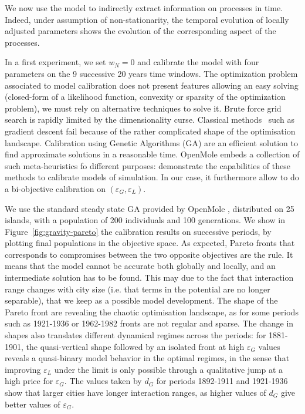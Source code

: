 \documentclass{article}
\begin{document}
We now use the model to indirectly extract information on processes in time. Indeed, under assumption of non-stationarity, the temporal evolution of locally adjusted parameters shows the evolution of the corresponding aspect of the processes.

In a first experiment, we set $w_N=0$ and calibrate the model with four parameters on the 9 successive 20 years time windows. The optimization problem associated to model calibration does not present features allowing an easy solving (closed-form of a likelihood function, convexity or sparsity of the optimization problem), we must rely on alternative techniques to solve it. Brute force grid search is rapidly limited by the dimensionality curse. Classical methods~\citep{batty1972calibration} such as gradient descent fail because of the rather complicated shape of the optimisation landscape. Calibration using Genetic Algorithms (GA) are an efficient solution to find approximate solutions in a reasonable time. OpenMole embeds a collection of such meta-heuristics fo different purposes: \cite{schmitt2014half} demonstrate the capabilities of these methods to calibrate models of simulation. In our case, it furthermore allow to do a bi-objective calibration on $(\varepsilon_G,\varepsilon_L)$.

We use the standard steady state GA provided by OpenMole \citep{pumain2017urban}, distributed on 25 islands, with a population of 200 individuals and 100 generations. We show in Figure~\ref{fig:gravity-pareto} the calibration results on successive periods, by plotting final populations in the objective space. As expected, Pareto fronts that corresponds to compromises between the two opposite objectives are the rule. It means that the model cannot be accurate both globally and locally, and an intermediate solution has to be found. This may due to the fact that interaction range changes with city size (i.e. that terms in the potential are no longer separable), that we keep as a possible model development. The shape of the Pareto front are revealing the chaotic optimisation landscape, as for some periods such as 1921-1936 or 1962-1982 fronts are not regular and sparse. The change in shapes also translates different dynamical regimes across the periods: for 1881-1901, the quasi-vertical shape followed by an isolated front at high $\varepsilon_G$ values reveals a quasi-binary model behavior in the optimal regimes, in the sense that improving $\varepsilon_L$ under the limit is only possible through a qualitative jump at a high price for $\varepsilon_G$. The values taken by $d_G$ for periods 1892-1911 and 1921-1936 show that larger cities have longer interaction ranges, as higher values of $d_G$ give better values of $\varepsilon_G$.
\end{document}
